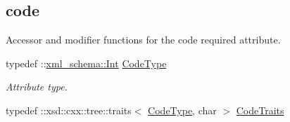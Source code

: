 \subsection*{code}
\label{_amgrpc13367945d5d4c91047b3b50234aa7ab}
Accessor and modifier functions for the code required attribute. \begin{DoxyCompactItemize}
\item 
\hypertarget{classopenstack_1_1xml_1_1CloudServersAPIFault_aa9f350c9dba08ae375b2a61568551550}{
typedef ::\hyperlink{namespacexml__schema_a12d975a13061c938969b2b5143e97645}{xml\_\-schema::Int} \hyperlink{classopenstack_1_1xml_1_1CloudServersAPIFault_aa9f350c9dba08ae375b2a61568551550}{CodeType}}
\label{classopenstack_1_1xml_1_1CloudServersAPIFault_aa9f350c9dba08ae375b2a61568551550}

\begin{DoxyCompactList}\small\item\em Attribute type. \item\end{DoxyCompactList}\item 
\hypertarget{classopenstack_1_1xml_1_1CloudServersAPIFault_aa709ccf179ebbad4abc9e9ff1956fc74}{
typedef ::xsd::cxx::tree::traits$<$ \hyperlink{classopenstack_1_1xml_1_1CloudServersAPIFault_aa9f350c9dba08ae375b2a61568551550}{CodeType}, char $>$ \hyperlink{classopenstack_1_1xml_1_1CloudServersAPIFault_aa709ccf179ebbad4abc9e9ff1956fc74}{CodeTraits}}
\label{classopenstack_1_1xml_1_1CloudServersAPIFault_aa709ccf179ebbad4abc9e9ff1956fc74}


\end{DoxyCompactItemize}
